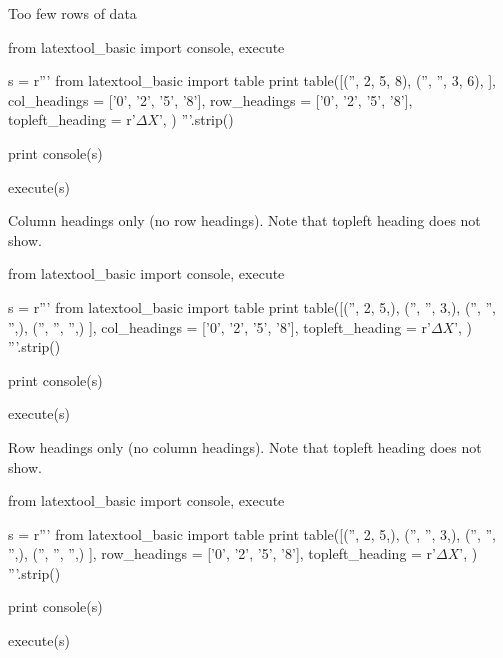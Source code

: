 \newpage
Too few rows of data
\begin{python}
from latextool_basic import console, execute

s = r'''
from latextool_basic import table
print table([('',  2, 5,  8),
             ('', '', 3,  6),
            ],
            col_headings = ['0', '2', '5', '8'],
            row_headings = ['0', '2', '5', '8'],
            topleft_heading = r'$\Delta X$',
           )
'''.strip()

print console(s)

execute(s)

\end{python}







\newpage
Column headings only (no row headings).
Note that topleft heading does not show.
\begin{python}
from latextool_basic import console, execute

s = r'''
from latextool_basic import table
print table([('',  2, 5,),
             ('', '', 3,),
             ('', '', '',),
             ('', '', '',)
            ],
            col_headings = ['0', '2', '5', '8'],
            topleft_heading = r'$\Delta X$',
           )
'''.strip()

print console(s)

execute(s)

\end{python}






\newpage
Row headings only (no column headings).
Note that topleft heading does not show.
\begin{python}
from latextool_basic import console, execute

s = r'''
from latextool_basic import table
print table([('',  2, 5,),
             ('', '', 3,),
             ('', '', '',),
             ('', '', '',)
            ],
            row_headings = ['0', '2', '5', '8'],
            topleft_heading = r'$\Delta X$',
           )
'''.strip()

print console(s)

execute(s)

\end{python}

